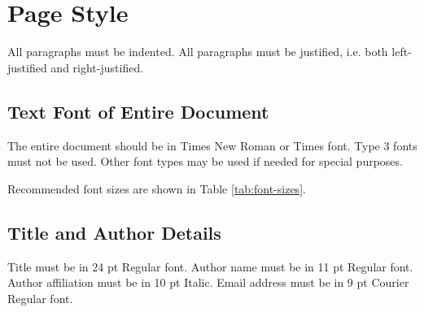 \section{Page Style}
\label{sec:page style}

All paragraphs must be indented.  All paragraphs must be
justified, i.e. both left-justified and right-justified. 

\subsection{Text Font of Entire Document}

The entire document should be in Times New Roman or Times font.
Type 3 fonts must not be used.  Other font types may be used if
needed for special purposes.  

Recommended font sizes are shown in Table \ref{tab:font-sizes}.

\subsection{Title and Author Details}
\label{sec:title and author details}

Title must be in 24 pt Regular font.  Author name must be in 11
pt Regular font.  Author affiliation must be in 10 pt Italic.
Email address must be in 9 pt Courier Regular font.  

